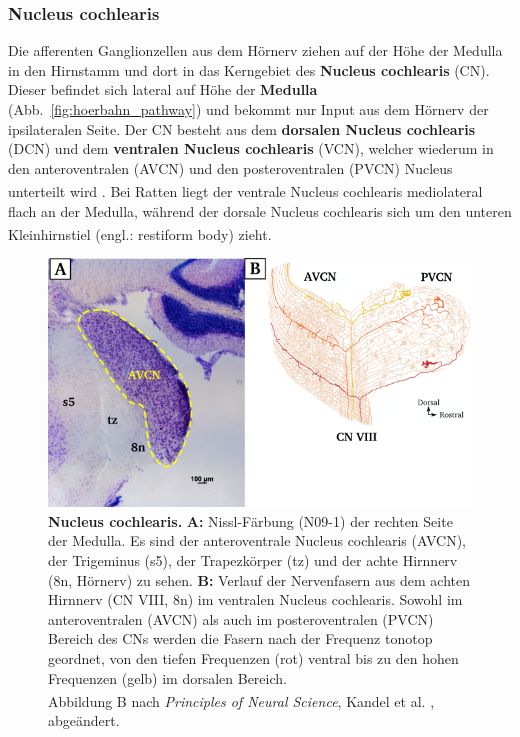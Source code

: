 \subsubsection*{Nucleus cochlearis}

Die afferenten Ganglionzellen aus dem Hörnerv ziehen auf der Höhe der Medulla in den Hirnstamm und dort in das Kerngebiet des \textbf{Nucleus cochlearis} (CN).  Dieser befindet sich  lateral auf Höhe der  \textbf{Medulla} (Abb.~\ref{fig:hoerbahn_pathway}) und bekommt nur Input aus dem Hörnerv der ipsilateralen Seite. Der CN besteht aus dem  \textbf{dorsalen Nucleus cochlearis} (DCN) und dem  \textbf{ventralen Nucleus cochlearis} (VCN), welcher wiederum in den anteroventralen (AVCN) und den posteroventralen (PVCN) Nucleus unterteilt wird \textsuperscript{\cite[Kap.~22]{paxinos2014rat}}. Bei Ratten liegt der ventrale Nucleus cochlearis mediolateral flach an der Medulla, während der dorsale Nucleus cochlearis sich um den unteren Kleinhirnstiel (engl.: restiform body) \textsuperscript{\cite[Kap.~22]{paxinos2014rat}} zieht.

\begin{figure}[H]
    \centering
    \includegraphics[width = \textwidth]{pictures/auditory/CN.png}
    \caption[Nucleus cochlearis]{\textbf{Nucleus cochlearis.} \textbf{A:} Nissl-Färbung (N09-1) der rechten Seite der Medulla. Es sind der anteroventrale Nucleus cochlearis (AVCN), der Trigeminus (s5), der Trapezkörper (tz) und der achte Hirnnerv (8n, Hörnerv) zu sehen. \textbf{B:} Verlauf der Nervenfasern aus dem achten Hirnnerv (CN VIII, 8n) im ventralen Nucleus cochlearis. Sowohl im anteroventralen (AVCN) als auch im posteroventralen (PVCN) Bereich des CNs werden die Fasern nach der Frequenz tonotop geordnet, von den tiefen Frequenzen (rot) ventral bis zu den hohen Frequenzen (gelb) im dorsalen Bereich. \\
    Abbildung B nach \textit{Principles of Neural Science}, Kandel et al. \textsuperscript{\cite[Kap.~31]{kandel2013principles}}, abgeändert.}
    \label{fig:Nucleus_cochlearis}
\end{figure}



